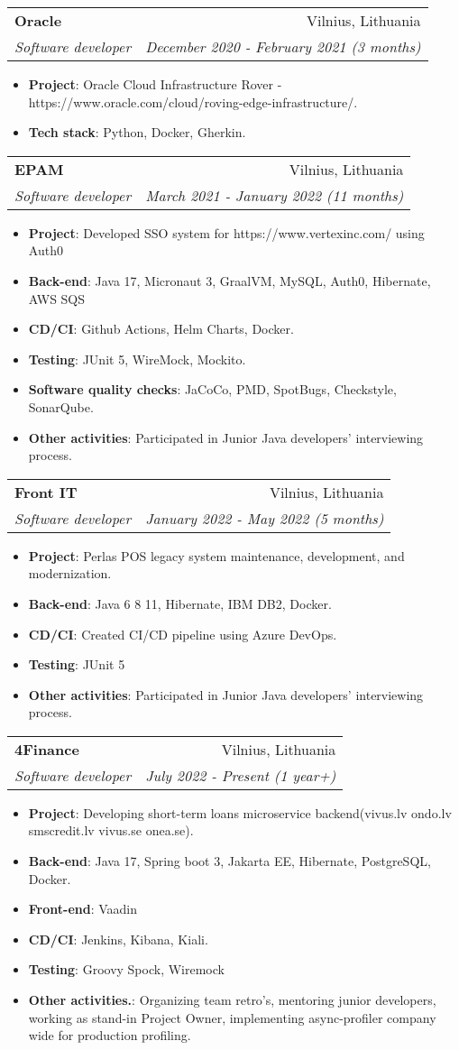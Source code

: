 \documentclass[letterpaper,11pt]{article}
\makeatletter
\newcommand{\resumeItem}[2]{
  \item\small{
    \textbf{#1}{: #2 \vspace{-2pt}}
  }
}
\newcommand{\resumeSubheading}[4]{
  \vspace{-1pt}\item
    \begin{tabular*}{0.97\textwidth}[t]{l@{\extracolsep{\fill}}r}
      \textbf{#1} & #2 \\
      \textit{\small#3} & \textit{\small #4} \\
    \end{tabular*}\vspace{-5pt}
}
\newcommand{\resumeItemListStart}{\begin{itemize}}
\newcommand{\resumeItemListEnd}{\end{itemize}\vspace{-5pt}}
\makeatother
\begin{document}
    \resumeSubheading
      {Oracle}{Vilnius, Lithuania}
      {Software developer}{December 2020 - February 2021 (3 months)}
      \resumeItemListStart
	 \resumeItem{Project}
	          {Oracle Cloud Infrastructure Rover - https://www.oracle.com/cloud/roving-edge-infrastructure/.}
      \resumeItem{Tech stack}
	          {Python, Docker, Gherkin.}
      \resumeItemListEnd
      
       \resumeSubheading
      {EPAM}{Vilnius, Lithuania}
      {Software developer}{March 2021 - January 2022 (11 months)}
      \resumeItemListStart
	  \resumeItem{Project}
	          {Developed SSO system for https://www.vertexinc.com/ using Auth0}
	 \resumeItem{Back-end}
	          {Java 17, Micronaut 3, GraalVM, MySQL, Auth0, Hibernate, AWS SQS}
	 \resumeItem{CD/CI}
	          {Github Actions, Helm Charts, Docker.}
	 \resumeItem{Testing}
	          {JUnit 5, WireMock, Mockito.}
	\resumeItem{Software quality checks}
	          {JaCoCo, PMD, SpotBugs, Checkstyle, SonarQube.}
	\resumeItem{Other activities}
	          {Participated in Junior Java developers' interviewing process.}
      \resumeItemListEnd
      
      \resumeSubheading
      {Front IT}{Vilnius, Lithuania}
      {Software developer}{January 2022 - May 2022 (5 months)}
      \resumeItemListStart
	  \resumeItem{Project}
	          {Perlas POS legacy system maintenance, development, and modernization.}
	 \resumeItem{Back-end}
	          {Java 6 8 11, Hibernate, IBM DB2, Docker.}
	 \resumeItem{CD/CI}
	          {Created CI/CD pipeline using Azure DevOps.}
	 \resumeItem{Testing}
	          {JUnit 5}
	\resumeItem{Other activities}
	          {Participated in Junior Java developers' interviewing process.}
      \resumeItemListEnd
\pagebreak
      \resumeSubheading
      {4Finance}{Vilnius, Lithuania}
      {Software developer}{July 2022 - Present (1 year+)}
      \resumeItemListStart
	  \resumeItem{Project}
	          {Developing short-term loans microservice backend(vivus.lv ondo.lv smscredit.lv vivus.se onea.se).}
	 \resumeItem{Back-end}
	          {Java 17, Spring boot 3, Jakarta EE, Hibernate, PostgreSQL, Docker.}
	 \resumeItem{Front-end}
	          {Vaadin}
	 \resumeItem{CD/CI}
	          {Jenkins, Kibana, Kiali.}
	 \resumeItem{Testing}
	          {Groovy Spock, Wiremock}
	\resumeItem{Other activities.}
	          {Organizing team retro's, mentoring junior developers, working as stand-in Project Owner, implementing async-profiler company wide for production profiling.}
      \resumeItemListEnd
      
\end{document}
